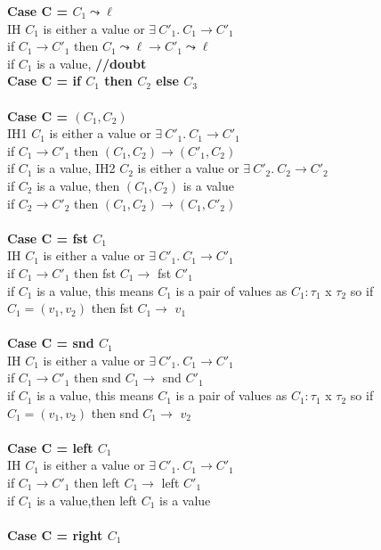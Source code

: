 \documentclass{article}
\begin{document}
\textbf{Case C = $C_1 \leadsto \ell$} \\
IH $C_1$ is either a value or $  \exists \ C'_1.\ C_1 \to C'_1 $ \\
if $C_1 \to C'_1$ then $C_1 \leadsto \ell \to C'_1 \leadsto \ell$ \\
if $C_1$ is a value,  \textbf{//doubt} 
\\
\textbf{Case C = if $C_1$ then $C_2$ else $C_3$} \\
\\
\textbf{Case C = $(C_1,C_2)$} \\
IH1 $C_1$ is either a value or $  \exists \ C'_1.\ C_1 \to C'_1 $ \\
if $C_1 \to C'_1$ then $(C_1,C_2) \to (C'_1, C_2)$\\
if $C_1$ is a value, IH2 $C_2$ is either a value or $  \exists \ C'_2.\ C_2 \to C'_2 $ \\
if $C_2$ is a value, then $(C_1,C_2)$ is a value \\
if $C_2 \to C'_2$ then $(C_1,C_2) \to (C_1,C'_2)$ \\ \\
\textbf{Case C = fst $C_1$} \\
IH $C_1$ is either a value or $  \exists \ C'_1.\ C_1 \to C'_1 $ \\
if $C_1 \to C'_1$ then fst $C_1 \to$ fst $C'_1$\\
if $C_1$ is a value, this means $C_1$ is a pair of values as $C_1: \tau_1$ x $\tau_2$
 so if $C_1 = (v_1, v_2)$ then fst $C_1 \to$ $v_1$\\ \\
\textbf{Case C = snd $C_1$} \\
IH $C_1$ is either a value or $  \exists \ C'_1.\ C_1 \to C'_1 $ \\
if $C_1 \to C'_1$ then snd $C_1 \to$ snd $C'_1$\\
if $C_1$ is a value, this means $C_1$ is a pair of values as $C_1: \tau_1$ x $\tau_2$
 so if $C_1 = (v_1, v_2)$ then snd $C_1 \to$ $v_2$\\ \\
\textbf{Case C = left $C_1$} \\
IH $C_1$ is either a value or $  \exists \ C'_1.\ C_1 \to C'_1 $ \\
if $C_1 \to C'_1$ then left $C_1 \to$ left $C'_1$\\
if $C_1$ is a value,then left $C_1$ is a value\\ \\
\textbf{Case C = right $C_1$} \\
\end{document}
